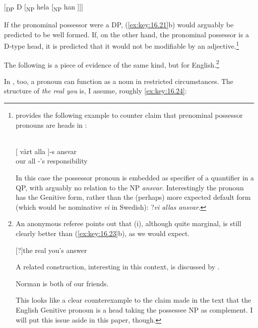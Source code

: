 \documentclass[output=paper]{langsci/langscibook}
\begin{document}
\ea\label{ex:key:16.22}
    {}[\textsubscript{DP} D [\textsubscript{NP} hela [\textsubscript{NP} han ]]]
\z

If the pronominal possessor were a DP, (\ref{ex:key:16.21}b) would arguably be
predicted to be well formed. If, on the other hand, the pronominal possessor is
a D-type head, it is predicted that it would not be modifiable by an
adjective.\footnote{\citet[227--230]{Julien2005} provides the following example
    to counter  claim that prenominal possessor pronouns
    are heads in :

\begin{exe}
    \\
	\gll {}[ vårt alla ]-s ansvar \\
        {} our  all \hphantom{]}-’s  responsibility\\
\end{exe}

In this case the possessor pronoun is embedded as specifier of a quantifier in
a QP, with arguably no relation to the NP \emph{ansvar}.  Interestingly the
pronoun has the Genitive form, rather than the (perhaps) more expected default
form (which would be nominative \emph{vi} in Swedish):
?\emph{vi allas ansvar}.}

The following is a piece of evidence of the same kind, but for
English.\footnote{An anonymous referee points out that (i), although quite
    marginal, is still clearly better than (\ref{ex:key:16.23}b), as we would expect.

\begin{exe}
    [?]{the real you’s answer}
\end{exe}

A related construction, interesting in this context, is discussed by
\textcite{TsoulasWoods2019}.

\begin{exe}
     Norman is both of our friends.
\end{exe}

This looks like a clear counterexample to the claim made in the text that the
English Genitive pronoun is a head taking the possessee NP as
complement. I will put this issue aside in this paper, though.}

\ea\label{ex:key:16.23}
	\z
\z

In , too, a pronoun can function as a noun in restricted circumstances.
The structure of \emph{the real you} is, I assume, roughly \eqref{ex:key:16.24}:
\end{document}
